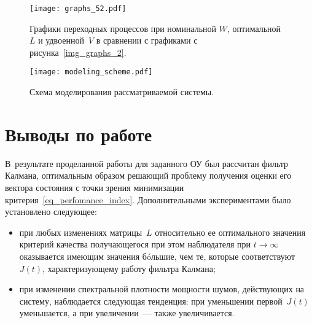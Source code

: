 \begin{figure}[h!]
    \centering
    \texttt{[image: graphs\_52.pdf]}
    \vspace{0cm}
    \caption{Графики переходных процессов при номинальной $W$, оптимальной~$L$ и удвоенной~$V$ в сравнении с графиками с рисунка~\ref{img_graphs_2}.}
    \label{img_graphs_52}
\end{figure}

\begin{figure}[h!]
    \centering
    \texttt{[image: modeling\_scheme.pdf]}
    \vspace{0.5cm}
    \caption{Схема моделирования рассматриваемой системы.}
    \label{img_modeling_scheme}
\end{figure}


\section{Выводы по работе}
В~результате проделанной работы для заданного ОУ был рассчитан фильтр Калмана, оптимальным образом решающий проблему получения оценки его вектора состояния с точки зрения минимизации критерия~\eqref{eq_perfomance_index}.
Дополнительными экспериментами было установлено следующее:
\begin{itemize}
    \item при любых изменениях матрицы~$L$ относительно ее оптимального значения критерий качества получающегося при этом наблюдателя при $t \rightarrow \infty$ оказывается имеющим значения б\'oльшие, чем те, которые соответствуют~$J(t)$, характеризующему работу фильтра Калмана;
    \item при изменении спектральной плотности мощности шумов, действующих на систему, наблюдается следующая тенденция: при уменьшении первой~$J(t)$ уменьшается, а при увеличении~--- также увеличивается.
\end{itemize}
